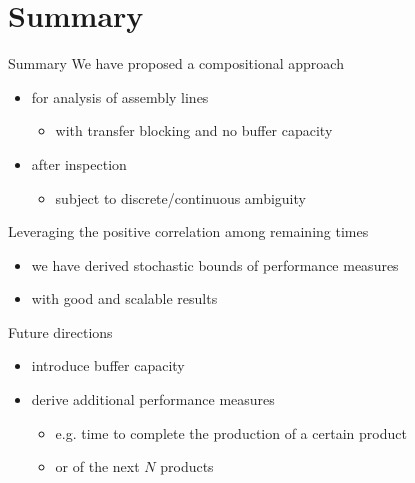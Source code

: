 
\section{Summary}

  \begin{frame}{Summary}
    We have proposed a compositional approach
    \begin{itemize}
      \item for analysis of assembly lines
      \begin{itemize}
        \item with transfer blocking and no buffer capacity
      \end{itemize}
      \item after inspection
      \begin{itemize}
        \item subject to discrete/continuous ambiguity
      \end{itemize}
    \end{itemize}
    
    \vspace{1em}
    Leveraging the positive correlation among remaining times
    \begin{itemize}
      \item we have derived stochastic bounds of performance measures
      \item with good and scalable results
    \end{itemize}
    
    \vspace{1em}
    Future directions
    \begin{itemize}
      \item introduce buffer capacity
      \item derive additional performance measures
      \begin{itemize}
        \item e.g. time to complete the production of a certain product
        \item or of the next $N$ products
      \end{itemize}
    \end{itemize}
  \end{frame}